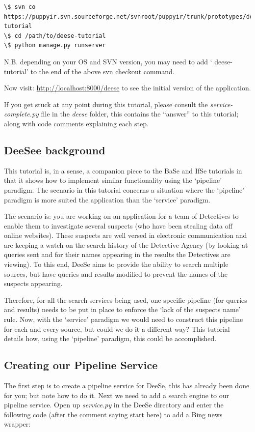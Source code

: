\documentclass[letterpaper,10pt,english]{sphinxmanual}
\begin{document}
\begin{Verbatim}[commandchars=\\\{\}]
\$ svn co https://puppyir.svn.sourceforge.net/svnroot/puppyir/trunk/prototypes/deese-tutorial
\$ cd /path/to/deese-tutorial
\$ python manage.py runserver
\end{Verbatim}

N.B. depending on your OS and SVN version, you may need to add ` deese-tutorial' to the end of the above svn checkout command.

Now visit: \href{http://localhost:8000/deese}{http://localhost:8000/deese} to see the initial version of the application.

If you get stuck at any point during this tutorial, please consult the \emph{service-complete.py} file in the \emph{deese} folder, this contains the ``answer'' to this tutorial; along with code comments explaining each step.


\subsection{DeeSee background}
\label{pipeline-tutorial:deesee-background}
This tutorial is, in a sense, a companion piece to the BaSe and IfSe tutorials in that it shows how to implement similar functionality using the `pipeline' paradigm. The scenario in this tutorial  concerns a situation where the `pipeline' paradigm is more suited the application than the `service' paradigm.

The scenario is: you are working on an application for a team of Detectives to enable them to investigate several suspects (who have been stealing data off online websites). These suspects are well versed in electronic communication and are keeping a watch on the search history of the Detective Agency (by looking at queries sent and for their names appearing in the results the Detectives are viewing). To this end, DeeSe aims to provide the ability to search multiple sources, but have queries and results modified to prevent the names of the suspects appearing.

Therefore, for all the search services being used, one specific pipeline (for queries and results) needs to be put in place to enforce the `lack of the suspects name' rule. Now, with the `service' paradigm we would need to construct this pipeline for each and every source, but could we do it a different way? This tutorial details how, using the `pipeline' paradigm, this could be accomplished.


\subsection{Creating our Pipeline Service}
\label{pipeline-tutorial:creating-our-pipeline-service}
The first step is to create a pipeline service for DeeSe, this has already been done for you; but note how to do it. Next we need to add a search engine to our pipeline service. Open up \emph{service.py} in the DeeSe directory and enter the following code (after the comment saying start here) to add a Bing news wrapper:
\end{document}
